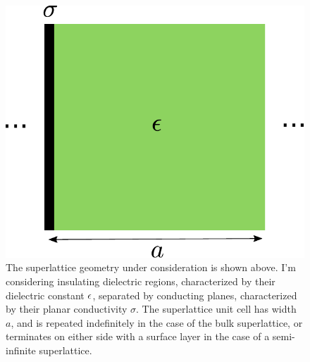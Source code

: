 \begin{figure}
    \centering
    \includegraphics[width=0.5\columnwidth]{figures/superlattice-geometry.pdf}
    \caption{
        The superlattice geometry under consideration is shown above.  I'm considering insulating dielectric regions, characterized by their dielectric constant $\epsilon$, separated by conducting planes, characterized by their planar conductivity $\sigma$.  The superlattice unit cell has width $a$, and is repeated indefinitely in the case of the bulk superlattice, or terminates on either side with a surface layer in the case of a semi-infinite superlattice.
    }
    \label{figure: superlattice geometry}
\end{figure}

